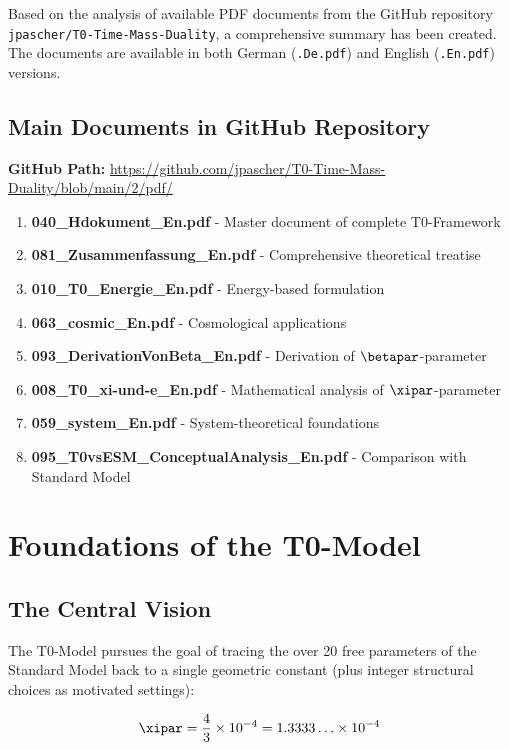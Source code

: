 Based on the analysis of available PDF documents from the GitHub repository \texttt{jpascher/T0-Time-Mass-Duality}, a comprehensive summary has been created. The documents are available in both German (\texttt{.De.pdf}) and English (\texttt{.En.pdf}) versions.

\subsection{Main Documents in GitHub Repository}

\textbf{GitHub Path:} \url{https://github.com/jpascher/T0-Time-Mass-Duality/blob/main/2/pdf/}

\begin{enumerate}
	\item \textbf{040\_Hdokument\_En.pdf} - Master document of complete T0-Framework
	\item \textbf{081\_Zusammenfassung\_En.pdf} - Comprehensive theoretical treatise
	\item \textbf{010\_T0\_Energie\_En.pdf} - Energy-based formulation
	\item \textbf{063\_cosmic\_En.pdf} - Cosmological applications
	\item \textbf{093\_DerivationVonBeta\_En.pdf} - Derivation of $\betapar$-parameter
	\item \textbf{008\_T0\_xi-und-e\_En.pdf} - Mathematical analysis of $\xipar$-parameter
	\item \textbf{059\_system\_En.pdf} - System-theoretical foundations
	\item \textbf{095\_T0vsESM\_ConceptualAnalysis\_En.pdf} - Comparison with Standard Model
\end{enumerate}

\section{Foundations of the T0-Model}

\subsection{The Central Vision}

The T0-Model pursues the goal of tracing the over 20 free parameters of the Standard Model back to a single geometric constant (plus integer structural choices as motivated settings):

\begin{equation}
	\xipar = \frac{4}{3} \times 10^{-4} = 1.3333\ldots \times 10^{-4}
\end{equation}

